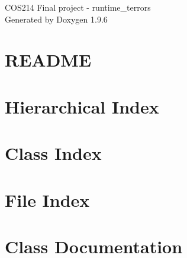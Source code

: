 \documentclass[twoside]{book}
\newcommand{\+}{\discretionary{\mbox{\scriptsize$\hookleftarrow$}}{}{}}
\newcommand{\clearemptydoublepage}{%
    \newpage{\pagestyle{empty}\cleardoublepage}%
  }
\begin{document}
  \raggedbottom
    \hypersetup{pageanchor=false,
                bookmarksnumbered=true,
                pdfencoding=unicode
               }
  \begin{titlepage}
  \vspace*{7cm}
  \begin{center}%
  {\Large COS214 Final project -\/ runtime\+\_\+terrors}\\
  \vspace*{1cm}
  {\large Generated by Doxygen 1.9.6}\\
  \end{center}
  \end{titlepage}
  \clearemptydoublepage
  \tableofcontents
  \clearemptydoublepage
  \hypersetup{pageanchor=true}
\chapter{README}
\label{md_README}

\chapter{Hierarchical Index}

\chapter{Class Index}

\chapter{File Index}

\chapter{Class Documentation}












































\end{document}
